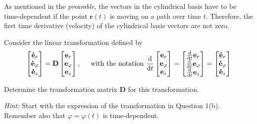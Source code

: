 \documentclass[10pt]{article}
\newcommand{\noin}{\noindent}
\newcommand{\veccoll}[3]{
        \begin{bmatrix}
                   #1\\
                   #2\\
                   #3\\
                 \end{bmatrix}}
\begin{document}
\pagebreak

\noin{\bf 2.} As mentioned in the \textit{preamble}, the vectors in the cylindrical basis have to be
time-dependent if the point $\mathbf{r} (t)$ is moving on a path over time $t$. Therefore, the first
time derivative (velocity) of the cylindrical basis vectors are not zero.  \bigskip

\noin{(a)} Consider the linear transformation defined by
$$ \veccoll{\mathbf{\dot e}_r}{\mathbf{\dot e}_\varphi}{\mathbf{\dot
    e}_z} = \mathbf{D} \veccoll{\mathbf{e}_r}{\mathbf{e}_\varphi}{\mathbf{e}_z},
\hspace{0.5cm}\text{with the notation } \frac{\mathrm{d}}{\mathrm{d}t}
\veccoll{\mathbf{e}_r}{\mathbf{e}_\varphi}{\mathbf{e}_z} = \veccoll{\frac{\mathrm{d}}{\mathrm{d}t} \mathbf{e}_r}{\frac{\mathrm{d}}{\mathrm{d}t} \mathbf{e}_\varphi}{\frac{\mathrm{d}}{\mathrm{d}t} \mathbf{e}_z} = \veccoll{\mathbf{\dot e}_r}{\mathbf{\dot e}_\varphi}{\mathbf{\dot
    e}_z}$$

\noindent Determine the transformation matrix $\mathbf{D}$ for this transformation.
\medskip

\noindent \textit{Hint:} Start with the expression of the transformation in Question 1(b). Remember
also that $\varphi = \varphi(t)$ is time-dependent.
\end{document}
